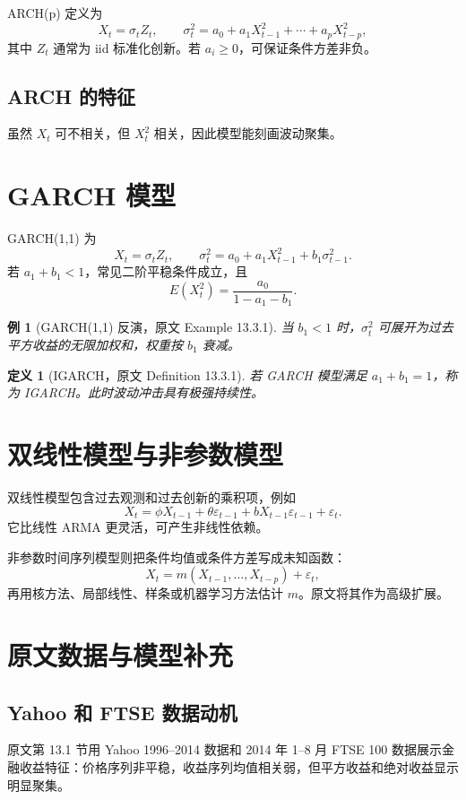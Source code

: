 \documentclass[11pt,a4paper,openany]{ctexbook}
\newtheorem{definition}{定义}[section]
\newtheorem{example}{例}[section]
\begin{document}
ARCH(p) 定义为
\[
  X_t=\sigma_t Z_t,\qquad
  \sigma_t^2=a_0+a_1X_{t-1}^2+\cdots+a_pX_{t-p}^2,
\]
其中 \(Z_t\) 通常为 iid 标准化创新。若 \(a_i\ge0\)，可保证条件方差非负。

\subsection{ARCH 的特征}

虽然 \(X_t\) 可不相关，但 \(X_t^2\) 相关，因此模型能刻画波动聚集。

\section{GARCH 模型}

GARCH(1,1) 为
\[
  X_t=\sigma_tZ_t,\qquad
  \sigma_t^2=a_0+a_1X_{t-1}^2+b_1\sigma_{t-1}^2.
\]
若 \(a_1+b_1<1\)，常见二阶平稳条件成立，且
\[
  E(X_t^2)=\frac{a_0}{1-a_1-b_1}.
\]

\begin{example}[GARCH(1,1) 反演，原文 Example 13.3.1]
当 \(b_1<1\) 时，\(\sigma_t^2\) 可展开为过去平方收益的无限加权和，权重按 \(b_1\) 衰减。
\end{example}

\begin{definition}[IGARCH，原文 Definition 13.3.1]
若 GARCH 模型满足 \(a_1+b_1=1\)，称为 IGARCH。此时波动冲击具有极强持续性。
\end{definition}

\section{双线性模型与非参数模型}

双线性模型包含过去观测和过去创新的乘积项，例如
\[
  X_t=\phi X_{t-1}+\theta\varepsilon_{t-1}
      +bX_{t-1}\varepsilon_{t-1}+\varepsilon_t.
\]
它比线性 ARMA 更灵活，可产生非线性依赖。

非参数时间序列模型则把条件均值或条件方差写成未知函数：
\[
  X_t=m(X_{t-1},\ldots,X_{t-p})+\varepsilon_t,
\]
再用核方法、局部线性、样条或机器学习方法估计 \(m\)。原文将其作为高级扩展。

\section{原文数据与模型补充}

\subsection{Yahoo 和 FTSE 数据动机}
原文第 13.1 节用 Yahoo 1996--2014 数据和 2014 年 1--8 月 FTSE 100 数据展示金融收益特征：价格序列非平稳，收益序列均值相关弱，但平方收益和绝对收益显示明显聚集。
\end{document}
